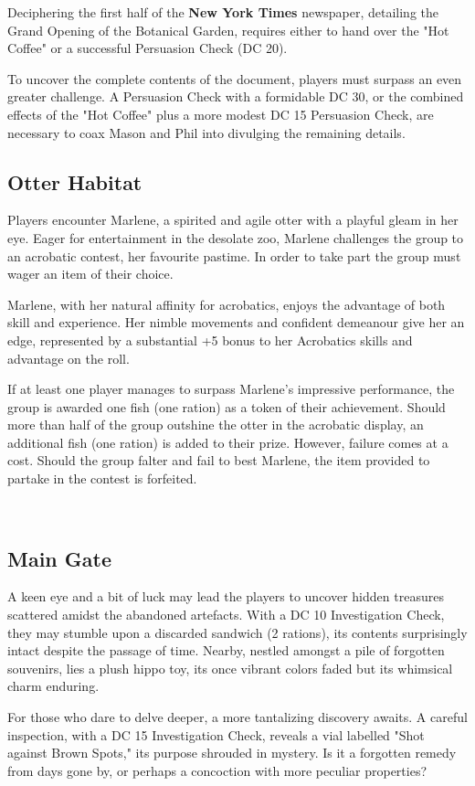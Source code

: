 Deciphering the first half of the \textbf{New York Times} newspaper, detailing the Grand Opening of the Botanical Garden, requires either to hand over the "Hot Coffee" or a successful Persuasion Check (DC 20).

To uncover the complete contents of the document, players must surpass an even greater challenge. A Persuasion Check with a formidable DC 30, or the combined effects of the "Hot Coffee" plus a more modest DC 15 Persuasion Check, are necessary to coax Mason and Phil into divulging the remaining details.
\subsection*{ Otter Habitat}
Players encounter Marlene, a spirited and agile otter with a playful gleam in her eye. Eager for entertainment in the desolate zoo, Marlene challenges the group to an acrobatic contest, her favourite pastime. In order to take part the group must wager an item of their choice. 

Marlene, with her natural affinity for acrobatics, enjoys the advantage of both skill and experience. Her nimble movements and confident demeanour give her an edge, represented by a substantial +5 bonus to her Acrobatics skills and advantage on the roll.

If at least one player manages to surpass Marlene's impressive performance, the group is awarded one fish (one ration) as a token of their achievement. Should more than half of the group outshine the otter in the acrobatic display, an additional fish (one ration) is added to their prize. However, failure comes at a cost. Should the group falter and fail to best Marlene, the item provided to partake in the contest is forfeited.

\hfill\\\eject
\subsection*{ Main Gate}
A keen eye and a bit of luck may lead the players to uncover hidden treasures scattered amidst the abandoned artefacts. With a DC 10 Investigation Check, they may stumble upon a discarded sandwich (2 rations), its contents surprisingly intact despite the passage of time. Nearby, nestled amongst a pile of forgotten souvenirs, lies a plush hippo toy, its once vibrant colors faded but its whimsical charm enduring.

For those who dare to delve deeper, a more tantalizing discovery awaits. A careful inspection, with a DC 15 Investigation Check, reveals a vial labelled "Shot against Brown Spots," its purpose shrouded in mystery. Is it a forgotten remedy from days gone by, or perhaps a concoction with more peculiar properties?
